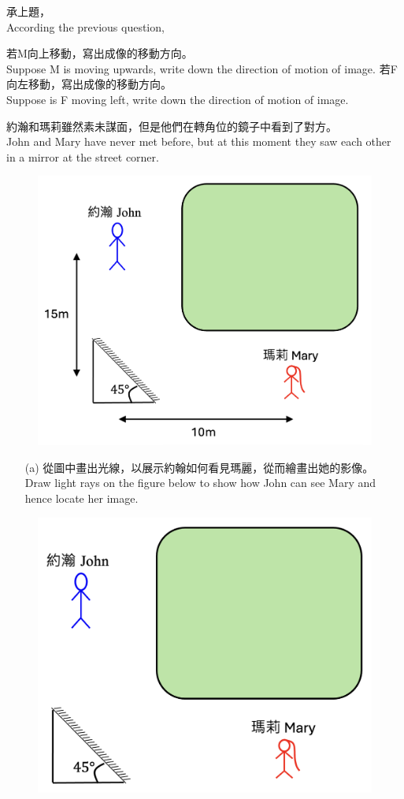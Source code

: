 \documentclass[beamer=true]{standalone}
\begin{document}
\begin{eg}
    承上題，\\According the previous question, 
    \begin{tasks}
        \task [(a)] 若M向上移動，寫出成像的移動方向。\\Suppose M is moving upwards, write down the direction of motion of image.\vspace{1.5cm}
        \task [(b)] 若F向左移動，寫出成像的移動方向。\\Suppose is F moving left, write down the direction of motion of image.
    \end{tasks}

\end{eg}



\begin{eg}
    約瀚和瑪莉雖然素未謀面，但是他們在轉角位的鏡子中看到了對方。\\John and Mary have never met before, but at this moment they saw each other in a mirror at the street corner.\bigskip
    \begin{figure}
        \centering
        \includegraphics[width=0.55\linewidth]{assets/dwqdrcr322d.png}
        
        
    \end{figure}
    
\end{eg}
\begin{eg}
    \begin{itemize}
        \item [(a)] 從圖中畫出光線，以展示約翰如何看見瑪麗，從而繪畫出她的影像。\\Draw light rays on the figure below to show how John can see Mary and hence locate her image.
    \end{itemize}
    \begin{figure}
        \centering
        \includegraphics[width=0.4\linewidth]{assets/dewkdk21ed.png}
        
        
    \end{figure}
\end{eg}
\end{document}
